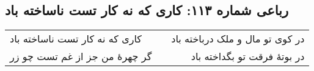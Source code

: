 \begin{center}
\section*{رباعی شماره ۱۱۳: کاری که نه کار تست ناساخته باد}
\label{sec:sh113}
\begin{longtable}{l p{0.5cm} r}
کاری که نه کار تست ناساخته باد
&&
در کوی تو مال و ملک درباخته باد
\\
گر چهرهٔ من جز از غم تست چو زر
&&
در بوتهٔ فرقت تو بگداخته باد
\\
\end{longtable}
\end{center}
